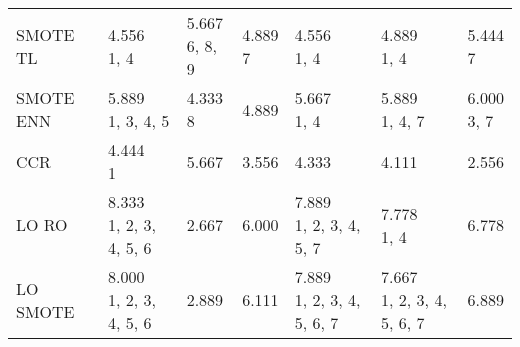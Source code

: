 \begin{tabular}{lllllll}
SMOTE TL   &              \makecell{4.556 \\ \scriptsize{1, 4}} &              \makecell{5.667 \\ \scriptsize{6, 8, 9}} &  \makecell{4.889 \\ \scriptsize{7}} &                 \makecell{4.556 \\ \scriptsize{1, 4}} &                 \makecell{4.889 \\ \scriptsize{1, 4}} &     \makecell{5.444 \\ \scriptsize{7}} \\
SMOTE ENN  &        \makecell{5.889 \\ \scriptsize{1, 3, 4, 5}} &                    \makecell{4.333 \\ \scriptsize{8}} &   \makecell{4.889 \\ \scriptsize{}} &                 \makecell{5.667 \\ \scriptsize{1, 4}} &              \makecell{5.889 \\ \scriptsize{1, 4, 7}} &  \makecell{6.000 \\ \scriptsize{3, 7}} \\
CCR        &                 \makecell{4.444 \\ \scriptsize{1}} &                     \makecell{5.667 \\ \scriptsize{}} &   \makecell{3.556 \\ \scriptsize{}} &                     \makecell{4.333 \\ \scriptsize{}} &                     \makecell{4.111 \\ \scriptsize{}} &      \makecell{2.556 \\ \scriptsize{}} \\
LO RO      &  \makecell{8.333 \\ \scriptsize{1, 2, 3, 4, 5, 6}} &                     \makecell{2.667 \\ \scriptsize{}} &   \makecell{6.000 \\ \scriptsize{}} &     \makecell{7.889 \\ \scriptsize{1, 2, 3, 4, 5, 7}} &                 \makecell{7.778 \\ \scriptsize{1, 4}} &      \makecell{6.778 \\ \scriptsize{}} \\
LO SMOTE   &  \makecell{8.000 \\ \scriptsize{1, 2, 3, 4, 5, 6}} &                     \makecell{2.889 \\ \scriptsize{}} &   \makecell{6.111 \\ \scriptsize{}} &  \makecell{7.889 \\ \scriptsize{1, 2, 3, 4, 5, 6, 7}} &  \makecell{7.667 \\ \scriptsize{1, 2, 3, 4, 5, 6, 7}} &      \makecell{6.889 \\ \scriptsize{}} \\
\bottomrule
\end{tabular}
